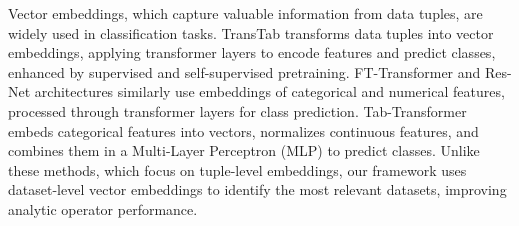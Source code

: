 
Vector embeddings, which capture valuable information from data tuples, are widely used in classification tasks. TransTab \cite{b14TransTab} transforms data tuples into vector embeddings, applying transformer layers to encode features and predict classes, enhanced by supervised and self-supervised pretraining. FT-Transformer \cite{b15FTransformer} and Res-Net architectures similarly use embeddings of categorical and numerical features, processed through transformer layers for class prediction. Tab-Transformer \cite{b16TabTransformer} embeds categorical features into vectors, normalizes continuous features, and combines them in a Multi-Layer Perceptron (MLP) to predict classes. Unlike these methods, which focus on tuple-level embeddings, our framework uses dataset-level vector embeddings to identify the most relevant datasets, improving analytic operator performance.



